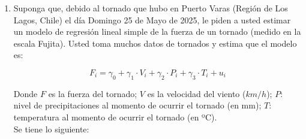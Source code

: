 \documentclass[10pt,a4paper]{article}
\begin{document}
\begin{enumerate}
    
    \item     Suponga que, debido al tornado que hubo en Puerto Varas (Región de Los Lagos, Chile) el día Domingo 25 de Mayo de 2025, le piden a usted estimar un modelo de regresión lineal simple de la fuerza de un tornado (medido en la escala Fujita). Usted toma muchos datos de tornados y estima que el modelo es:

    $$F_i = \gamma_0 + \gamma_1 \cdot V_i + \gamma_2 \cdot P_i + \gamma_3 \cdot T_i + u_i$$

    Donde $F$ es la fuerza del tornado; $V$ es la velocidad del viento ($km/h$); $P$: nivel de precipitaciones al momento de ocurrir el tornado (en mm); $T$: temperatura al momento de ocurrir el tornado (en ºC).\\

    Se tiene lo siguiente:


\end{enumerate}
\end{document}
